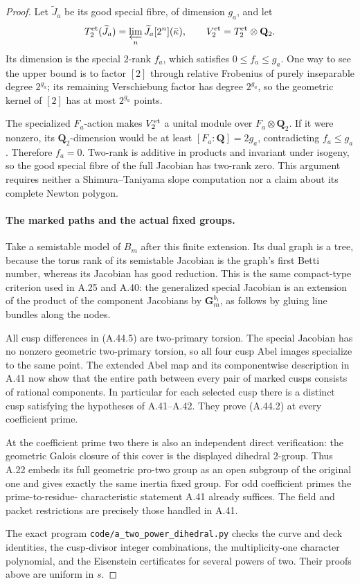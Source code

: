 \begin{proof}
Let \(\widetilde J_a\) be its good special fibre,
of dimension \(g_a\), and let
\[
 T_2^{\rm et}(\widetilde J_a)
       =\varprojlim_n\widetilde J_a[2^n](\bar\kappa),
 \qquad V_2^{\rm et}=T_2^{\rm et}\otimes\mathbf Q_2.
\]
Its dimension is the special \(2\)-rank \(f_a\),
which satisfies \(0\le f_a\le g_a\). One way
to see the upper bound is to factor \([2]\) through
relative Frobenius of purely inseparable degree
\(2^{g_a}\); its remaining Verschiebung factor
has degree \(2^{g_a}\), so the geometric kernel
of \([2]\) has at most \(2^{g_a}\) points.

The specialized \(F_a\)-action makes
\(V_2^{\rm et}\) a unital module over
\(F_a\otimes\mathbf Q_2\). If it were nonzero,
its \(\mathbf Q_2\)-dimension would be at least
\([F_a:\mathbf Q]=2g_a\), contradicting
\(f_a\le g_a\). Therefore \(f_a=0\).
Two-rank is additive in products and invariant under
isogeny, so the good special fibre of the full Jacobian
has two-rank zero. This argument requires neither a
Shimura--Taniyama slope computation nor a claim about
its complete Newton polygon.

\paragraph{The marked paths and the actual fixed groups.}
Take a semistable model of \(B_m\) after this finite
extension. Its dual graph is a tree, because the torus
rank of its semistable Jacobian is the graph's first
Betti number, whereas its Jacobian has good reduction.
This is the same compact-type criterion used in A.25
and A.40: the generalized special Jacobian is an
extension of the product of the component Jacobians
by \(\mathbf G_m^{b_1}\), as follows by gluing
line bundles along the nodes.

All cusp differences in (A.44.5) are two-primary
torsion. The special Jacobian has no nonzero geometric
two-primary torsion, so all four cusp Abel images
specialize to the same point. The extended Abel map
and its componentwise description in A.41 now show
that the entire path between every pair of marked
cusps consists of rational components. In particular
for each selected cusp there is a distinct cusp
satisfying the hypotheses of A.41--A.42. They prove
(A.44.2) at every coefficient prime.

At the coefficient prime two there is also an
independent direct verification: the geometric Galois
closure of this cover is the displayed dihedral
\(2\)-group. Thus A.22 embeds its full geometric
pro-two group as an open subgroup of the original
one and gives exactly the same inertia fixed group.
For odd coefficient primes the prime-to-residue-
characteristic statement A.41 already suffices.
The field and packet restrictions are precisely
those handled in A.41.

The exact program \texttt{code/a\_two\_power\_dihedral.py}
checks the curve and deck identities, the cusp-divisor
integer combinations, the multiplicity-one character
polynomial, and the Eisenstein certificates for several
powers of two. Their proofs above are uniform in \(s\).
\end{proof}

